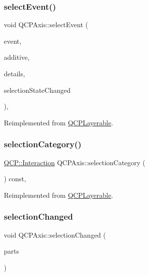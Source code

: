 \subsubsection{\texorpdfstring{select\+Event()}{selectEvent()}}
{\footnotesize\ttfamily void Q\+C\+P\+Axis\+::select\+Event (\begin{DoxyParamCaption}\item[{Q\+Mouse\+Event $\ast$}]{event,  }\item[{bool}]{additive,  }\item[{const Q\+Variant \&}]{details,  }\item[{bool $\ast$}]{selection\+State\+Changed }\end{DoxyParamCaption})\hspace{0.3cm}{\ttfamily [protected]}, {\ttfamily [virtual]}}



Reimplemented from \hyperlink{class_q_c_p_layerable_a7498c2d0d081cf7cad0fb3bb93aa0e91}{Q\+C\+P\+Layerable}.

\mbox{\label{class_q_c_p_axis_ab751e3e96495716a2f6742ca7d7b3d49}} 
\subsubsection{\texorpdfstring{selection\+Category()}{selectionCategory()}}
{\footnotesize\ttfamily \hyperlink{namespace_q_c_p_a2ad6bb6281c7c2d593d4277b44c2b037}{Q\+C\+P\+::\+Interaction} Q\+C\+P\+Axis\+::selection\+Category (\begin{DoxyParamCaption}{ }\end{DoxyParamCaption}) const\hspace{0.3cm}{\ttfamily [protected]}, {\ttfamily [virtual]}}



Reimplemented from \hyperlink{class_q_c_p_layerable_a908c9edda761886f33893be326dab77d}{Q\+C\+P\+Layerable}.

\mbox{\label{class_q_c_p_axis_a62b598abeee7174a05f9d542cc85b1f5}} 
\subsubsection{\texorpdfstring{selection\+Changed}{selectionChanged}}
{\footnotesize\ttfamily void Q\+C\+P\+Axis\+::selection\+Changed (\begin{DoxyParamCaption}\item[{const Q\+C\+P\+Axis\+::\+Selectable\+Parts \&}]{parts }\end{DoxyParamCaption})\hspace{0.3cm}{\ttfamily [signal]}}


